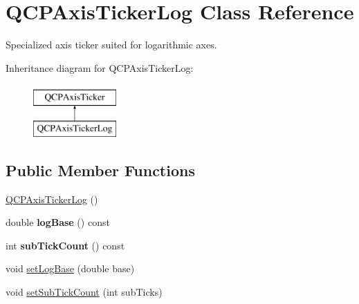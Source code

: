 \hypertarget{class_q_c_p_axis_ticker_log}{}\section{Q\+C\+P\+Axis\+Ticker\+Log Class Reference}
\label{class_q_c_p_axis_ticker_log}


Specialized axis ticker suited for logarithmic axes.  


Inheritance diagram for Q\+C\+P\+Axis\+Ticker\+Log\+:\begin{figure}[H]
\begin{center}
\leavevmode
\includegraphics[height=2.000000cm]{class_q_c_p_axis_ticker_log}
\end{center}
\end{figure}
\subsection*{Public Member Functions}
\begin{DoxyCompactItemize}
\item 
\mbox{\hyperlink{class_q_c_p_axis_ticker_log_af3cb86ea5eef2023c0b96b5260c4cbdf}{Q\+C\+P\+Axis\+Ticker\+Log}} ()
\item 
\mbox{\label{class_q_c_p_axis_ticker_log_a841a97f2b6850ff1ef3aa73e89d94775}} 
double {\bfseries log\+Base} () const
\item 
\mbox{\label{class_q_c_p_axis_ticker_log_aebe43661977364fc1fd220fa1ae36a10}} 
int {\bfseries sub\+Tick\+Count} () const
\item 
void \mbox{\hyperlink{class_q_c_p_axis_ticker_log_ac6e3b4e03baea3816f898869ab9751ef}{set\+Log\+Base}} (double base)
\item 
void \mbox{\hyperlink{class_q_c_p_axis_ticker_log_ad51989c798c0cfd50936d77aac57c56a}{set\+Sub\+Tick\+Count}} (int sub\+Ticks)
\end{DoxyCompactItemize}
